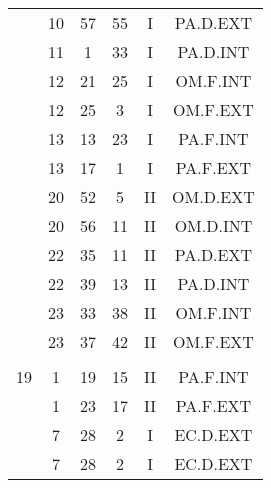 \documentclass[12pt, a4paper]{article}
\begin{document}
\begin{multicols}{3}
{\begin{tabular}{c c c c c c}
	 	 	 	 & 10 & 57 & 55 & I & PA.D.EXT\\%
	 	 	 	 & 11 & 1 & 33 & I & PA.D.INT\\%
	 	 	 	 & 12 & 21 & 25 & I & OM.F.INT\\%
	 	 	 	 & 12 & 25 & 3 & I & OM.F.EXT\\%
	 	 	 	 & 13 & 13 & 23 & I & PA.F.INT\\%
	 	 	 	 & 13 & 17 & 1 & I & PA.F.EXT\\%
	 	 	 	 & 20 & 52 & 5 & II & OM.D.EXT\\%
	 	 	 	 & 20 & 56 & 11 & II & OM.D.INT\\%
	 	 	 	 & 22 & 35 & 11 & II & PA.D.EXT\\%
	 	 	 	 & 22 & 39 & 13 & II & PA.D.INT\\%
	 	 	 	 & 23 & 33 & 38 & II & OM.F.INT\\%
	 	 	 	 & 23 & 37 & 42 & II & OM.F.EXT\\%
	 	 	 	 & & & & & \\%
	 	 	 	19 & 1 & 19 & 15 & II & PA.F.INT\\%
	 	 	 	 & 1 & 23 & 17 & II & PA.F.EXT\\%
	 	 	 	 & 7 & 28 & 2 & I & EC.D.EXT\\%
	 	 	 	 & 7 & 28 & 2 & I & EC.D.EXT\\%
	 	 \end{tabular}
 	}
\end{multicols}
\end{document}

